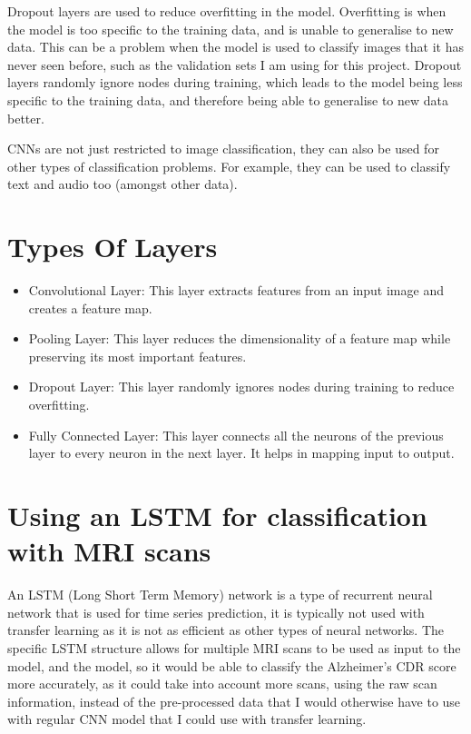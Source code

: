 \documentclass[]{final_report}
\begin{document}
Dropout layers are used to reduce overfitting in the model. Overfitting is when the model is too specific to the training data, and is unable to generalise to new data. This can be a problem when the model is used to classify images that it has never seen before, such as the validation sets I am using for this project. Dropout layers randomly ignore nodes during training, which leads to the model being less specific to the training data, and therefore being able to generalise to new data better.

CNNs are not just restricted to image classification, they can also be used for other types of classification problems. For example, they can be used to classify text and audio too (amongst other data).

\section{Types Of Layers}

\begin{itemize}
  \item Convolutional Layer: This layer extracts features from an input image and creates a feature map.

  \item  Pooling Layer: This layer reduces the dimensionality of a feature map while preserving its most important features.

  \item  Dropout Layer: This layer randomly ignores nodes during training to reduce overfitting.

  \item  Fully Connected Layer: This layer connects all the neurons of the previous layer to every neuron in the next layer. It helps in mapping input to output.
\end{itemize}


\section{Using an LSTM for classification with MRI scans}
An LSTM (Long Short Term Memory) network is a type of recurrent neural network that is used for time series prediction, it is typically not used with transfer learning as it is not as efficient as other types of neural networks. The specific LSTM structure allows for multiple MRI scans to be used as input to the model, and the model, so it would be able to classify the Alzheimer's CDR score more accurately, as it could take into account more scans, using the raw scan information, instead of the pre-processed data that I would otherwise have to use with regular CNN model that I could use with transfer learning.
\end{document}
